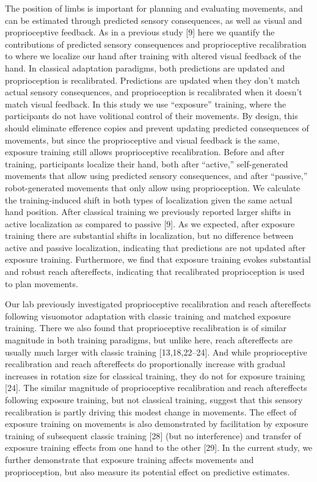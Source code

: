 \documentclass[10pt,letterpaper]{article}
\begin{document}
The position of limbs is important for planning and evaluating
movements, and can be estimated through predicted sensory consequences,
as well as visual and proprioceptive feedback. As in a previous study
{[}9{]} here we quantify the contributions of predicted sensory
consequences and proprioceptive recalibration to where we localize our
hand after training with altered visual feedback of the hand. In
classical adaptation paradigms, both predictions are updated and
proprioception is recalibrated. Predictions are updated when they don't
match actual sensory consequences, and proprioception is recalibrated
when it doesn't match visual feedback. In this study we use ``exposure''
training, where the participants do not have volitional control of their
movements. By design, this should eliminate efference copies and prevent
updating predicted consequences of movements, but since the
proprioceptive and visual feedback is the same, exposure training still
allows proprioceptive recalibration. Before and after training,
participants localize their hand, both after ``active,'' self-generated
movements that allow using predicted sensory consequences, and after
``passive,'' robot-generated movements that only allow using
proprioception. We calculate the training-induced shift in both types of
localization given the same actual hand position. After classical
training we previously reported larger shifts in active localization as
compared to passive {[}9{]}. As we expected, after exposure training
there are substantial shifts in localization, but no difference between
active and passive localization, indicating that predictions are not
updated after exposure training. Furthermore, we find that exposure
training evokes substantial and robust reach aftereffects, indicating
that recalibrated proprioception is used to plan movements.

Our lab previously investigated proprioceptive recalibration and reach
aftereffects following visuomotor adaptation with classic training and
matched exposure training. There we also found that proprioceptive
recalibration is of similar magnitude in both training paradigms, but
unlike here, reach aftereffects are usually much larger with classic
training {[}13,18,22--24{]}. And while proprioceptive recalibration and
reach aftereffects do proportionally increase with gradual increases in
rotation size for classical training, they do not for exposure training
{[}24{]}. The similar magnitude of proprioceptive recalibration and
reach aftereffects following exposure training, but not classical
training, suggest that this sensory recalibration is partly driving this
modest change in movements. The effect of exposure training on movements
is also demonstrated by facilitation by exposure training of subsequent
classic training {[}28{]} (but no interference) and transfer of exposure
training effects from one hand to the other {[}29{]}. In the current
study, we further demonstrate that exposure training affects movements
and proprioception, but also measure its potential effect on predictive
estimates.
\end{document}
